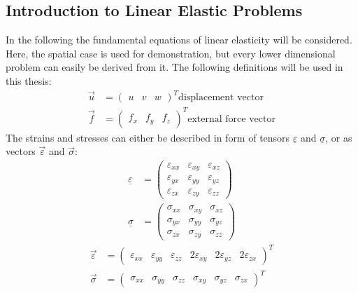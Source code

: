  \subsection{Introduction to Linear Elastic Problems}\label{sec:Shell-IntroLinEla}
 In the following the fundamental equations of linear elasticity will be considered. Here, the spatial case is used for demonstration, but every lower dimensional problem can easily be derived from it.
 The following definitions will be used in this thesis:
 \begin{align}
 \vec{u} &= \begin{pmatrix}
 u & v & w
 \end{pmatrix}^T \text{displacement\ vector}\\
 \vec{f} &= \begin{pmatrix}
 f_x & f_y & f_z
 \end{pmatrix}^T \text{external\ force\ vector}
 \end{align}
 The strains and stresses can either be described in form of tensors $\underline{\varepsilon}$ and $\underline{\sigma}$, or as vectors $\vec{\varepsilon}$ and $\vec{\sigma}$:
 \begin{align}
 \underline{\varepsilon} &= \begin{pmatrix}
 \varepsilon_{xx} & \varepsilon_{xy} & \varepsilon_{xz} \\
 \varepsilon_{yx} & \varepsilon_{yy} & \varepsilon_{yz} \\
 \varepsilon_{zx} & \varepsilon_{zy} & \varepsilon_{zz} \end{pmatrix}\\
 \underline{\sigma} &= \begin{pmatrix}
 \sigma_{xx} & \sigma_{xy} & \sigma_{xz} \\
 \sigma_{yx} & \sigma_{yy} & \sigma_{yz} \\
 \sigma_{zx} & \sigma_{zy} & \sigma_{zz} \end{pmatrix}
 \end{align}
 \begin{align}
 \vec{\varepsilon} &= \begin{pmatrix}
 \varepsilon_{xx} & \varepsilon_{yy} & \varepsilon_{zz} & 2\varepsilon_{xy} & 2\varepsilon_{yz} & 2\varepsilon_{zx} \end{pmatrix}^T\\
 \vec{\sigma} &= \begin{pmatrix}
 \sigma_{xx} & \sigma_{yy} & \sigma_{zz} & \sigma_{xy} & \sigma_{yz} & \sigma_{zx} \end{pmatrix}^T
 \end{align}

